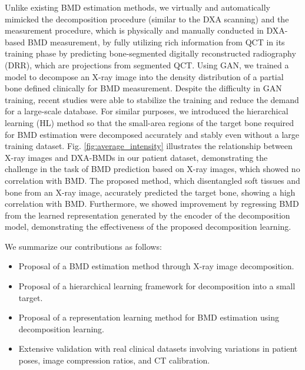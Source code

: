 \documentclass[times,twocolumn,final]{elsarticle}
\begin{document}
Unlike existing BMD estimation methods, we virtually and automatically mimicked the decomposition procedure (similar to the DXA scanning) and the measurement procedure, which is physically and manually conducted in DXA-based BMD measurement, by fully utilizing rich information from QCT in its training phase by predicting bone-segmented digitally reconstructed radiography (DRR), which are projections from segmented QCT. 
Using GAN, we trained a model to decompose an X-ray image into the density distribution of a partial bone defined clinically for BMD measurement. 
Despite the difficulty in GAN training, recent studies \citep{zhao_differentiable_2020,zhang_consistency_2020,wu_gradient_2021,tseng_regularizing_2021} were able to stabilize the training and reduce the demand for a large-scale database. 
For similar purposes, we introduced the hierarchical learning (HL) method so that the small-area regions of the target bone required for BMD estimation were decomposed accurately and stably even without a large training dataset.
Fig. \ref{fig:average_intensity} illustrates the relationship between X-ray images and DXA-BMDs in our patient dataset, demonstrating the challenge in the task of BMD prediction based on X-ray images, which showed no correlation with BMD. 
The proposed method, which disentangled soft tissues and bone from an X-ray image, accurately predicted the target bone, showing a high correlation with BMD.
Furthermore, we showed improvement by regressing BMD from the learned representation generated by the encoder of the decomposition model, demonstrating the effectiveness of the proposed decomposition learning.

We summarize our contributions as follows:
\begin{itemize}
    \item Proposal of a BMD estimation method through X-ray image decomposition.
    \item Proposal of a hierarchical learning framework for decomposition into a small target.
    \item Proposal of a representation learning method for BMD estimation using decomposition learning.
    \item Extensive validation with real clinical datasets involving variations in patient poses, image compression ratios, and CT calibration.
\end{itemize}
\end{document}
